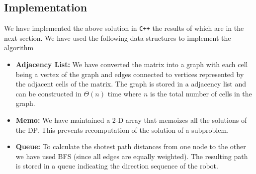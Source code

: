 \documentclass{article}
\begin{document}
\subsection{Implementation}
We have implemented the above solution in \verb|C++| the results of which are in the next section. We have used the following data structures to 
implement the algorithm
\begin{itemize}
    \item \textbf{Adjacency List:} We have converted the matrix into a graph with each cell being a vertex of the graph and edges connected to vertices represented by the adjacent cells of the matrix.
          The graph is stored in a adjacency list and can be constructed in $\Theta(n)$ time where $n$ is the total number of cells in the graph.
    \item \textbf{Memo: }We have maintained a 2-D array that memoizes all the solutions of the DP. This prevents recomputation of the solution of a subproblem.
    \item \textbf{Queue: }To calculate the shotest path distances from one node to the other we have used BFS (since all edges are equally weighted). The resulting path is stored in a queue indicating the direction sequence of the robot.
\end{itemize}
\end{document}
